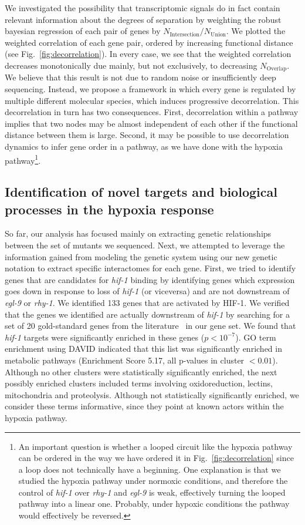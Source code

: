 \documentclass[9pt,twocolumn,twoside]{pnas-new}
\newcommand{\egl}{\emph{egl-9}}
\newcommand{\rhy}{\emph{rhy-1}}
\newcommand{\hif}{\emph{hif-1}}
\newcommand{\hifp}{HIF-1}
\newcommand{\hiftargets}{133}
\begin{document}
We investigated the possibility that transcriptomic signals do in fact contain
relevant information about the degrees of separation by weighting the robust
bayesian regression of each pair of genes by
$N_\mathrm{Intersection}/N_{\mathrm{Union}}$. We plotted the weighted
correlation of each gene pair, ordered by increasing functional distance
(see Fig.~\ref{fig:decorrelation}). In every case, we see that the weighted
correlation decreases monotonically due mainly, but not exclusively, to
decreasing $N_\mathrm{Overlap}$.
We believe that this result is not due to random noise or insufficiently deep
sequencing. Instead, we propose a framework in which every gene is regulated
by multiple different molecular species, which induces progressive decorrelation.
This decorrelation in turn has two consequences. First, decorrelation within a
pathway implies that two nodes may be almost independent of each other if the
functional distance between them is large. Second, it may be possible to use
decorrelation dynamics to infer gene order in a pathway, as we have done with
the hypoxia pathway\footnote{An important question is whether a looped circuit
like the hypoxia pathway can be ordered in the way we have ordered it in
Fig.~\ref{fig:decorrelation} since a loop does not technically have a beginning.
One explanation is that we studied the hypoxia pathway under normoxic conditions,
and therefore the control of \hif{} over \rhy{} and \egl{} is weak, effectively
turning the looped pathway into a linear one. Probably, under hypoxic conditions
the pathway would effectively be reversed.
}.

\subsection{Identification of novel targets and biological processes in the
            hypoxia response}
\label{sub:new_biology}
So far, our analysis has focused mainly on extracting genetic relationships
between the set of mutants we sequenced. Next, we attempted to leverage the
information gained from modeling the genetic system using our new genetic
notation to extract specific interactomes for each gene. First, we tried to
identify genes that are candidates for \hif{} binding by identifying genes
which expression goes down in response to loss of \hif{} (or viceversa) and are
not downstream of \egl{} or \rhy{}.
We identified \hiftargets{} genes that are activated by \hifp{}. We verified
that the genes we identified are actually downstream of \hif{} by searching for
a set of 20 gold-standard genes from the literature~\cite{Shen2006,Shen2005} in
our gene set. We found that \hif{} targets were significantly enriched in these
genes ($p<10^{-7}$). GO term enrichment using DAVID indicated that this list was
significantly enriched in metabolic pathways (Enrichment Score 5.17, all p-values
in cluster $<0.01$). Although no other clusters were statistically significantly
enriched, the next possibly enriched clusters included terms involving
oxidoreduction, lectins, mitochondria and proteolysis. Although not statistically
significantly enriched, we consider these terms informative, since they point at
known actors within the hypoxia pathway.
\end{document}
